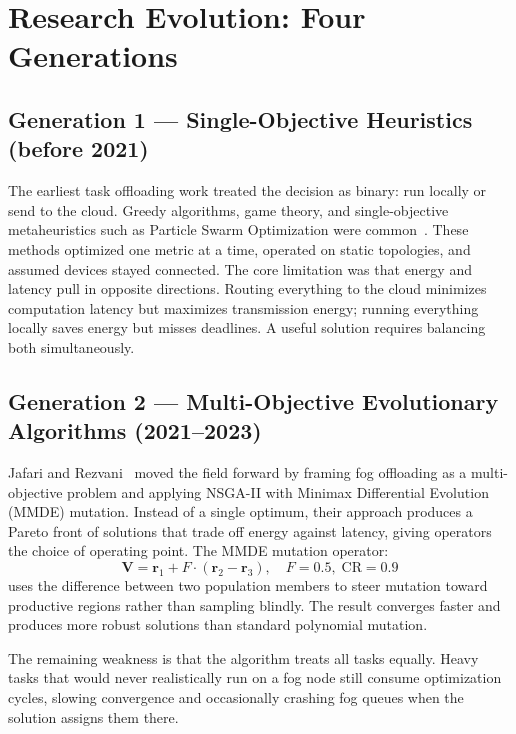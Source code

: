 \documentclass[12pt,a4paper]{article}
\begin{document}
\section{Research Evolution: Four Generations}
\label{sec:evolution}

\subsection{Generation 1 — Single-Objective Heuristics (before 2021)}

The earliest task offloading work treated the decision as binary: run locally or
send to the cloud. Greedy algorithms, game theory, and single-objective
metaheuristics such as Particle Swarm Optimization were common~\cite{jafari2021}.
These methods optimized one metric at a time, operated on static topologies, and
assumed devices stayed connected. The core limitation was that energy and latency
pull in opposite directions. Routing everything to the cloud minimizes computation
latency but maximizes transmission energy; running everything locally saves energy
but misses deadlines. A useful solution requires balancing both simultaneously.

\subsection{Generation 2 --- Multi-Objective Evolutionary Algorithms (2021--2023)}

Jafari and Rezvani~\cite{jafari2021} moved the field forward by framing fog
offloading as a multi-objective problem and applying NSGA-II with Minimax
Differential Evolution (MMDE) mutation. Instead of a single optimum, their
approach produces a Pareto front of solutions that trade off energy against latency,
giving operators the choice of operating point. The MMDE mutation operator:
\begin{equation}
  \mathbf{V} = \mathbf{r}_1 + F \cdot (\mathbf{r}_2 - \mathbf{r}_3),\quad
  F = 0.5,\;\mathrm{CR} = 0.9
  \label{eq:mmde}
\end{equation}
uses the difference between two population members to steer mutation toward
productive regions rather than sampling blindly. The result converges faster and
produces more robust solutions than standard polynomial mutation.

The remaining weakness is that the algorithm treats all tasks equally. Heavy
tasks that would never realistically run on a fog node still consume optimization
cycles, slowing convergence and occasionally crashing fog queues when the solution
assigns them there.
\end{document}
